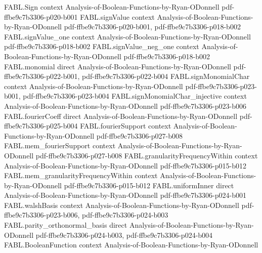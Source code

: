 \begin{theorem}
\label{FABL.expect_rankingPreference_mul}
\leanok
{}
\proofstep
  {FABL.Sign}
  {context}
  {Analysis-of-Boolean-Functions-by-Ryan-ODonnell}
  {pdf-ffbe9c7b3306-p020-b001}
\proofstep
  {FABL.signValue}
  {context}
  {Analysis-of-Boolean-Functions-by-Ryan-ODonnell}
  {pdf-ffbe9c7b3306-p020-b001,
    pdf-ffbe9c7b3306-p018-b002}
\proofstep
  {FABL.signValue_one}
  {context}
  {Analysis-of-Boolean-Functions-by-Ryan-ODonnell}
  {pdf-ffbe9c7b3306-p018-b002}
\proofstep
  {FABL.signValue_neg_one}
  {context}
  {Analysis-of-Boolean-Functions-by-Ryan-ODonnell}
  {pdf-ffbe9c7b3306-p018-b002}
\proofstep
  {FABL.monomial}
  {direct}
  {Analysis-of-Boolean-Functions-by-Ryan-ODonnell}
  {pdf-ffbe9c7b3306-p022-b001,
    pdf-ffbe9c7b3306-p022-b004}
\proofstep
  {FABL.signMonomialChar}
  {context}
  {Analysis-of-Boolean-Functions-by-Ryan-ODonnell}
  {pdf-ffbe9c7b3306-p023-b001,
    pdf-ffbe9c7b3306-p023-b004}
\proofstep
  {FABL.signMonomialChar_injective}
  {context}
  {Analysis-of-Boolean-Functions-by-Ryan-ODonnell}
  {pdf-ffbe9c7b3306-p023-b006}
\proofstep
  {FABL.fourierCoeff}
  {direct}
  {Analysis-of-Boolean-Functions-by-Ryan-ODonnell}
  {pdf-ffbe9c7b3306-p025-b004}
\proofstep
  {FABL.fourierSupport}
  {context}
  {Analysis-of-Boolean-Functions-by-Ryan-ODonnell}
  {pdf-ffbe9c7b3306-p027-b008}
\proofstep
  {FABL.mem_fourierSupport}
  {context}
  {Analysis-of-Boolean-Functions-by-Ryan-ODonnell}
  {pdf-ffbe9c7b3306-p027-b008}
\proofstep
  {FABL.granularityFrequencyWithin}
  {context}
  {Analysis-of-Boolean-Functions-by-Ryan-ODonnell}
  {pdf-ffbe9c7b3306-p015-b012}
\proofstep
  {FABL.mem_granularityFrequencyWithin}
  {context}
  {Analysis-of-Boolean-Functions-by-Ryan-ODonnell}
  {pdf-ffbe9c7b3306-p015-b012}
\proofstep
  {FABL.uniformInner}
  {direct}
  {Analysis-of-Boolean-Functions-by-Ryan-ODonnell}
  {pdf-ffbe9c7b3306-p024-b001}
\proofstep
  {FABL.walshBasis}
  {context}
  {Analysis-of-Boolean-Functions-by-Ryan-ODonnell}
  {pdf-ffbe9c7b3306-p023-b006,
    pdf-ffbe9c7b3306-p024-b003}
\proofstep
  {FABL.parity_orthonormal_basis}
  {direct}
  {Analysis-of-Boolean-Functions-by-Ryan-ODonnell}
  {pdf-ffbe9c7b3306-p024-b003,
    pdf-ffbe9c7b3306-p024-b004}
\proofstep
  {FABL.BooleanFunction}
  {context}
  {Analysis-of-Boolean-Functions-by-Ryan-ODonnell}

\end{theorem}
